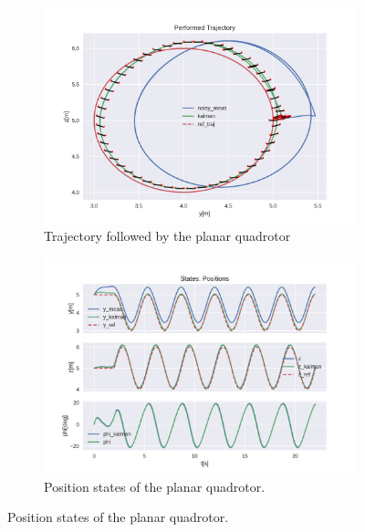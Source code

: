 \documentclass{thesisreport}
\begin{document}
\newpage

\begin{figure}[H]
	\begin{subfigure}{0.48\textwidth}
		\includegraphics[width=\linewidth]{Images/acados_simulations/circular_trajectory/planar_quadrotor/noisy/sim.png}
		\caption{Trajectory followed by the planar quadrotor} \label{fig:planar_sim_2d_noisy}
	\end{subfigure}\hspace*{\fill}
	\begin{subfigure}{0.48\textwidth}
		\includegraphics[width=\linewidth]{Images/acados_simulations/circular_trajectory/planar_quadrotor/noisy/posStates.png}
		\caption{Position states of the planar quadrotor.} \label{fig:planar_sim_pose_noisy}
	\end{subfigure}


\end{figure}
\end{document}

